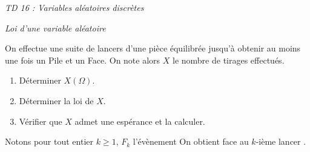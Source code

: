 \documentclass[a4paper,10pt]{report}
\begin{document}
\everymath{\displaystyle}

\begin{center}
\textit{{ {\huge TD 16 : Variables aléatoires discrètes}}}
\end{center}


\medskip

\begin{center}
\textit{{ {\large Loi d'une variable aléatoire}}}
\end{center}

\medskip

\begin{Exa} On effectue une suite de lancers d'une pièce équilibrée jusqu'à obtenir au moins une fois un Pile et un Face. On note alors $X$ le nombre de tirages effectués.

\begin{enumerate}
\item Déterminer $X(\Omega)$.
\item Déterminer la loi de $X$. 
\item Vérifier que $X$ admet une espérance et la calculer.
\end{enumerate}
\end{Exa}

\corr Notons pour tout entier $k \geq 1$, $F_k$ l'évènement \og On obtient face au $k$-ième lancer \fg .
\end{document}
